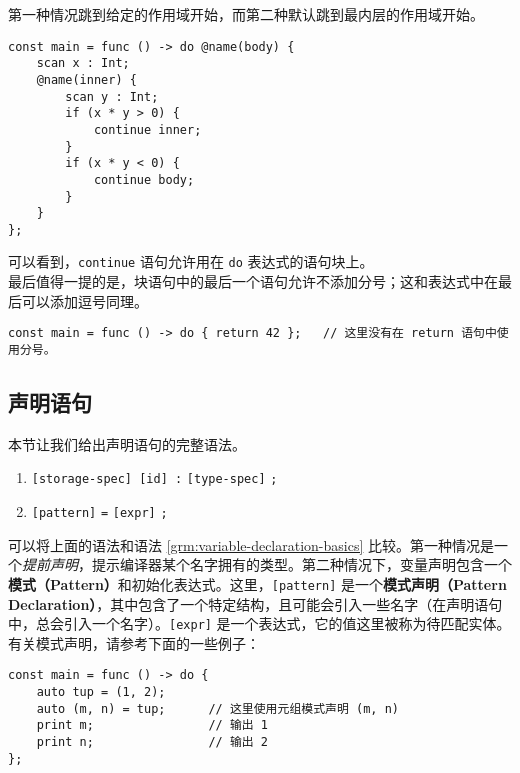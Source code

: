 第一种情况跳到给定的作用域开始，而第二种默认跳到最内层的作用域开始。

\begin{lstlisting}
const main = func () -> do @name(body) {
    scan x : Int;
    @name(inner) {
        scan y : Int;
        if (x * y > 0) {
            continue inner;
        }
        if (x * y < 0) {
            continue body;
        }
    }
};
\end{lstlisting}

可以看到，\lstinline!continue! 语句允许用在 \lstinline!do! 表达式的语句块上。 \\

最后值得一提的是，块语句中的最后一个语句允许不添加分号；这和表达式中在最后可以添加逗号同理。

\begin{lstlisting}
const main = func () -> do { return 42 };	// 这里没有在 return 语句中使用分号。
\end{lstlisting}

\subsection{声明语句}

本节让我们给出声明语句的完整语法。

\begin{grammar}[声明语句] \label{grm:declaration-statement}
\begin{enumerate}
    \item \lstinline![storage-spec] [id] :! \texttt{[type-spec]} \lstinline!;!
    \item \texttt{[pattern]} \lstinline!=! \texttt{[expr]} \lstinline!;!
\end{enumerate}
\end{grammar}

可以将上面的语法和语法 \ref{grm:variable-declaration-basics} 比较。第一种情况是一个\emph{提前声明}，提示编译器某个名字拥有的类型。第二种情况下，变量声明包含一个\textbf{模式（Pattern）}和初始化表达式。这里，\lstinline![pattern]! 是一个\textbf{模式声明（Pattern Declaration）}，其中包含了一个特定结构，且可能会引入一些名字（在声明语句中，总会引入一个名字）。\lstinline![expr]! 是一个表达式，它的值这里被称为待匹配实体。有关模式声明，请参考下面的一些例子：

\begin{lstlisting}
const main = func () -> do {
    auto tup = (1, 2);
    auto (m, n) = tup;      // 这里使用元组模式声明 (m, n)
    print m;                // 输出 1
    print n;                // 输出 2
};
\end{lstlisting}

